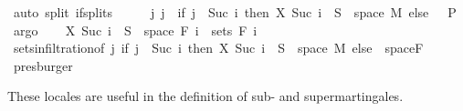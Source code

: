 \begin{isabellebody}
\ {\isacharparenleft}{\kern0pt}auto\ split{\isacharcolon}{\kern0pt}\ if{\isacharunderscore}{\kern0pt}splits{\isacharparenright}{\kern0pt}\isanewline
\ \ \isamarkupfalse%
\ \isamarkupfalse%
\ {\isachardoublequoteopen}{\isacharparenleft}{\kern0pt}{\isasymUnion}j{\isachardot}{\kern0pt}\ {\isacharbraceleft}{\kern0pt}j{\isacharbraceright}{\kern0pt}\ {\isasymtimes}\ {\isacharparenleft}{\kern0pt}if\ j\ {\isacharequal}{\kern0pt}\ Suc\ i\ then\ {\isacharparenleft}{\kern0pt}X\ {\isacharparenleft}{\kern0pt}Suc\ i{\isacharparenright}{\kern0pt}\ {\isacharminus}{\kern0pt}{\isacharbackquote}{\kern0pt}\ S\ {\isasyminter}\ space\ M{\isacharparenright}{\kern0pt}\ else\ {\isacharbraceleft}{\kern0pt}{\isacharbraceright}{\kern0pt}{\isacharparenright}{\kern0pt}{\isacharparenright}{\kern0pt}\ {\isasymin}\ {\isasymSigma}\isactrlsub P{\isachardoublequoteclose}\ \isamarkupfalse%
\ argo\isanewline
\ \ \isamarkupfalse%
\ {\isachardoublequoteopen}X\ {\isacharparenleft}{\kern0pt}Suc\ i{\isacharparenright}{\kern0pt}\ {\isacharminus}{\kern0pt}{\isacharbackquote}{\kern0pt}\ S\ {\isasyminter}\ space\ {\isacharparenleft}{\kern0pt}F\ i{\isacharparenright}{\kern0pt}\ {\isasymin}\ sets\ {\isacharparenleft}{\kern0pt}F\ i{\isacharparenright}{\kern0pt}{\isachardoublequoteclose}\ \isamarkupfalse%
\ sets{\isacharunderscore}{\kern0pt}in{\isacharunderscore}{\kern0pt}filtration{\isacharbrackleft}{\kern0pt}of\ {\isachardoublequoteopen}{\isasymlambda}j{\isachardot}{\kern0pt}\ if\ j\ {\isacharequal}{\kern0pt}\ Suc\ i\ then\ {\isacharparenleft}{\kern0pt}X\ {\isacharparenleft}{\kern0pt}Suc\ i{\isacharparenright}{\kern0pt}\ {\isacharminus}{\kern0pt}{\isacharbackquote}{\kern0pt}\ S\ {\isasyminter}\ space\ M{\isacharparenright}{\kern0pt}\ else\ {\isacharbraceleft}{\kern0pt}{\isacharbraceright}{\kern0pt}{\isachardoublequoteclose}{\isacharbrackright}{\kern0pt}\ space{\isacharunderscore}{\kern0pt}F\ \isamarkupfalse%
\ presburger\isanewline
{}\isamarkupfalse%
%
\endisatagproof
{\isafoldproof}%
%
\isadelimproof
%
\endisadelimproof
%
\isadelimdocument
%
\endisadelimdocument
%
\isatagdocument
%
\isamarkuptrue%
%
\endisatagdocument
{\isafolddocument}%
%
\isadelimdocument
%
\endisadelimdocument
%
\begin{isamarkuptext}%
These locales are useful in the definition of sub- and supermartingales.%
\end{isamarkuptext}\isamarkuptrue%
\isamarkupfalse%

\end{isabellebody}
